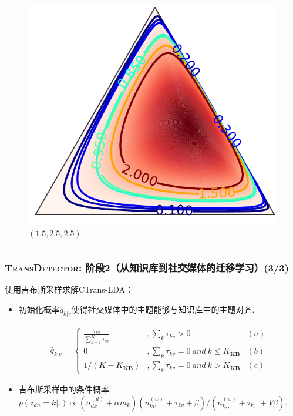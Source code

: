 \begin{frame}
\begin{columns}
\begin{column}{0.48\paperwidth}
	\begin{figure}
		\caption{$(1.5,2.5,2.5)$}
		\includegraphics[width=0.4\paperwidth]{img/croppedDirichletGraph10.pdf}	
	\end{figure}	
\end{column}	
\end{columns}

\end{frame}


\begin{frame}
\frametitle{\noindent \textsc{TransDetector}: 阶段2（从知识库到社交媒体的迁移学习）(3/3)}	
使用吉布斯采样求解CTrans-LDA：
\begin{itemize}
	\item 初始化概率\(\hat{q}_{k|v}\)使得社交媒体中的主题能够与知识库中的主题对齐.
\setlength{\abovedisplayskip}{0pt}
\setlength{\belowdisplayskip}{0pt}
\begin{scriptsize} 
\begin{equation}
\label{eq:initProbability}
\begin{aligned}
\hat{q}_{k|v}=
\left\{ \begin{aligned}
\frac{\tau_{kv}}{\sum_{k=1}^{K}\tau_{kv}} &,\sum_{k}\tau_{kv}>0 & (a)\\
0&, \sum_{k}\tau_{kv}=0 \ and \ k \leq K_{\bm{KB}} & (b)\\
1/(K-K_{\bm{KB}})&,\sum_{k}\tau_{kv}=0 \ and \ k > K_{\bm{KB}} & (c)
\end{aligned}\right.
\end{aligned}
\end{equation}
\end{scriptsize}
\item 吉布斯采样中的条件概率.
\(p(z_{dn}=k|.)\propto (n^{(d)}_{dk}+\alpha m_k)(n^{(w)}_{kv}+\tau_{kv}+\beta)/(n^{(w)}_{k,.}+\tau_{k,.}+V\beta)\).
\end{itemize}

\end{frame}




